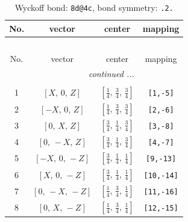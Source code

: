 \documentclass[fleqn,8pt]{jsarticle}
\begin{document}
\renewcommand{\arraystretch}{1.2}
\begin{longtable}{cccc}
\caption{Wyckoff bond: {\tt 8d@4c}, bond symmetry: {\tt .2.}}
 \\
 \hline \hline
No. & vector & center & mapping \\ \hline \endfirsthead

\multicolumn{3}{l}{\tablename\ \thetable{}} \\
 \hline \hline
No. & vector & center & mapping \\ \hline \endhead

 \hline \hline
\multicolumn{3}{r}{\footnotesize\it continued ...} \\ \endfoot

 \hline \hline
\multicolumn{3}{r}{} \\ \endlastfoot

1 & $\left[ X,\, 0,\, Z \right]$ & $\left[ \frac{1}{4},\, \frac{3}{4},\, \frac{3}{4} \right]$ & {\tt [1,-5]} \\ \hline
2 & $\left[ - X,\, 0,\, Z \right]$ & $\left[ \frac{1}{4},\, \frac{3}{4},\, \frac{3}{4} \right]$ & {\tt [2,-6]} \\ \hline
3 & $\left[ 0,\, X,\, Z \right]$ & $\left[ \frac{3}{4},\, \frac{1}{4},\, \frac{3}{4} \right]$ & {\tt [3,-8]} \\ \hline
4 & $\left[ 0,\, - X,\, Z \right]$ & $\left[ \frac{3}{4},\, \frac{1}{4},\, \frac{3}{4} \right]$ & {\tt [4,-7]} \\ \hline
5 & $\left[ - X,\, 0,\, - Z \right]$ & $\left[ \frac{3}{4},\, \frac{1}{4},\, \frac{1}{4} \right]$ & {\tt [9,-13]} \\ \hline
6 & $\left[ X,\, 0,\, - Z \right]$ & $\left[ \frac{3}{4},\, \frac{1}{4},\, \frac{1}{4} \right]$ & {\tt [10,-14]} \\ \hline
7 & $\left[ 0,\, - X,\, - Z \right]$ & $\left[ \frac{1}{4},\, \frac{3}{4},\, \frac{1}{4} \right]$ & {\tt [11,-16]} \\ \hline
8 & $\left[ 0,\, X,\, - Z \right]$ & $\left[ \frac{1}{4},\, \frac{3}{4},\, \frac{1}{4} \right]$ & {\tt [12,-15]} \\
\end{longtable}
\renewcommand{\arraystretch}{1.2}
\end{document}
